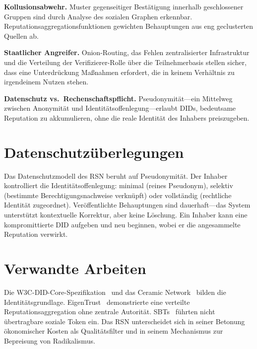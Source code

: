 \documentclass[11pt,a4paper,twocolumn]{article}
\begin{document}
\textbf{Kollusionsabwehr.} Muster gegenseitiger Bestätigung innerhalb geschlossener Gruppen sind durch Analyse des sozialen Graphen erkennbar. Reputationsaggregationsfunktionen gewichten Behauptungen aus eng geclusterten Quellen ab.

\textbf{Staatlicher Angreifer.} Onion-Routing, das Fehlen zentralisierter Infrastruktur und die Verteilung der Verifizierer-Rolle über die Teilnehmerbasis stellen sicher, dass eine Unterdrückung Maßnahmen erfordert, die in keinem Verhältnis zu irgendeinem Nutzen stehen.

\textbf{Datenschutz vs.\ Rechenschaftspflicht.} Pseudonymität---ein Mittelweg zwischen Anonymität und Identitätsoffenlegung---erlaubt DIDs, bedeutsame Reputation zu akkumulieren, ohne die reale Identität des Inhabers preiszugeben.

\section{Datenschutzüberlegungen}

Das Datenschutzmodell des RSN beruht auf Pseudonymität. Der Inhaber kontrolliert die Identitätsoffenlegung: minimal (reines Pseudonym), selektiv (bestimmte Berechtigungsnachweise verknüpft) oder vollständig (rechtliche Identität zugeordnet). Veröffentlichte Behauptungen sind dauerhaft---das System unterstützt kontextuelle Korrektur, aber keine Löschung. Ein Inhaber kann eine kompromittierte DID aufgeben und neu beginnen, wobei er die angesammelte Reputation verwirkt.

\section{Verwandte Arbeiten}

Die W3C-DID-Core-Spezifikation~\cite{did2022} und das Ceramic Network~\cite{ceramic2023} bilden die Identitätsgrundlage. EigenTrust~\cite{kamvar2003} demonstrierte eine verteilte Reputationsaggregation ohne zentrale Autorität. SBTs~\cite{weyl2022} führten nicht übertragbare soziale Token ein. Das RSN unterscheidet sich in seiner Betonung ökonomischer Kosten als Qualitätsfilter und in seinem Mechanismus zur Bepreisung von Radikalismus.
\end{document}

